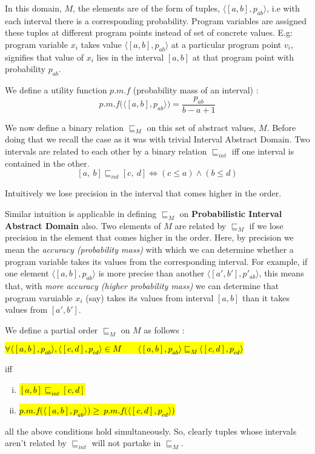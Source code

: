 \documentclass[final,3p, review, times]{util/elsarticle}
\begin{document}
In this domain, $M$, the elements are of the form of tuples, $\langle[a,b],p_{ab}\rangle$, i.e with each interval there is a corresponding probability. Program variables are assigned these tuples at different program points instead of set of concrete values. E.g: program variable $x_i$ takes value $\langle[a,b],p_{ab}\rangle$ at a particular program point $v_i$, signifies that value of $x_i$ lies in the interval $[a,b]$ at that program point with probability $p_{ab}$.

We define a utility function \underline{$\mathit{p.m.f}$} (probability mass of an interval) :
\begin{equation}
\label{eq:pmf}
p.m.f\Big(\langle[a,b],p_{ab}\rangle\Big)=\frac{p_{ab}}{b-a+1}
\end{equation}

We now define a binary relation $\sqsubseteq_M$ on this set of abstract values, $M$. Before doing that we recall the case as it was with trivial Interval Abstract Domain\cite{nielson99}. Two intervals are related to each other by a binary relation $\sqsubseteq_{int}$ iff one interval is contained in the other.
\begin{equation}\label{eq:interval_def}
[a,\ b]\sqsubseteq_{int}[c,\ d]\iff (c\leq a)\land (b\leq d)
\end{equation}

Intuitively we lose precision in the interval that comes higher in the order.

Similar intuition is applicable in defining $\sqsubseteq_M$ on \textbf{Probabilistic Interval Abstract Domain} also. Two elements of $M$ are related by $\sqsubseteq_M$ if we lose precision in the element that comes higher in the order. Here, by precision we mean the \textit{accuracy (probability mass)} with which we can determine whether a program variable takes its values from the corresponding interval. For example, if one element $\langle[a,b],p_{ab}\rangle$ is more precise than another $\langle[a',b'],p'_{ab}\rangle$, this means that, with \textit{more accuracy (higher probability mass)} we can determine that program varuiable $x_i$ (say) takes its values from interval $[a,b]$ than it takes values from $[a',b']$.

We define a partial order $\sqsubseteq_M$ on $M$ as follows :

\centerline{\hl{$\forall \langle[a,b],p_{ab}\rangle, \langle[c,d],p_{cd}\rangle\in M\qquad\langle[a,b],p_{ab}\rangle\sqsubseteq_M\langle[c,d],p_{cd}\rangle$}}
iff
\begin{enumerate}[i)]
\item \hl{$[a,b]\sqsubseteq_{int}[c,d]$}
\item \hl{$p.m.f\Big(\langle[a,b],p_{ab}\rangle\Big)\geq\ p.m.f\Big(\langle[c,d],p_{cd}\rangle\Big)$}
\end{enumerate}
all the above conditions hold simultaneously. So, clearly tuples whose intervals aren't related by $\sqsubseteq_{int}$ will not partake in $\sqsubseteq_M$.
\end{document}
